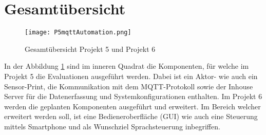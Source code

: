 \section{Gesamtübersicht}
\begin{figure}[H]
\centering
\texttt{[image: P5mqttAutomation.png]}
\caption{Gesamtübersicht Projekt 5 und Projekt 6}
\label{pic: Gesamtübersicht}
\end{figure}
 In der Abbildung \ref{pic: Gesamtübersicht} sind im inneren Quadrat die Komponenten, für welche im Projekt 5 die Evaluationen ausgeführt werden. Dabei ist ein Aktor- wie auch ein Sensor-Print, die Kommunikation mit dem MQTT-Protokoll sowie der Inhouse Server für die Datenerfassung und Systemkonfigurationen enthalten. Im Projekt 6 werden die geplanten Komponenten ausgeführt und erweitert. Im Bereich welcher erweitert werden soll, ist eine Bedieneroberfläche (GUI) wie auch eine Steuerung mittels Smartphone und als Wunschziel Sprachsteuerung inbegriffen.